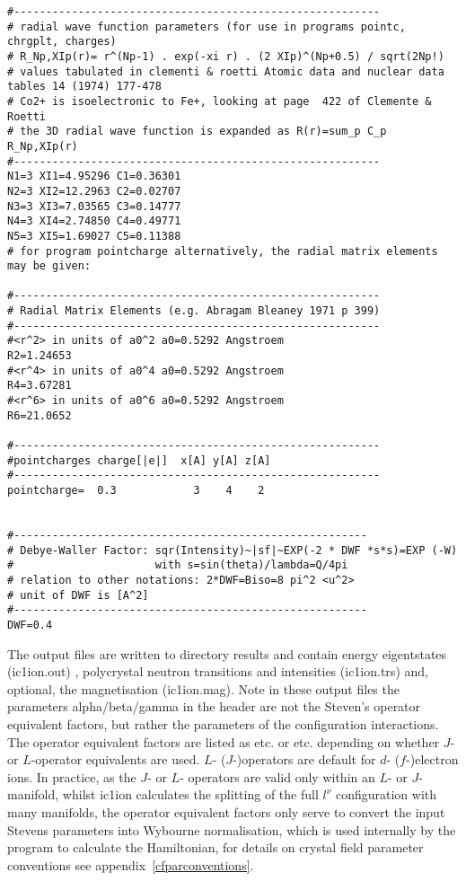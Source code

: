 {\begin{verbatim}
#---------------------------------------------------------
# radial wave function parameters (for use in programs pointc, chrgplt, charges) 
# R_Np,XIp(r)= r^(Np-1) . exp(-xi r) . (2 XIp)^(Np+0.5) / sqrt(2Np!)  
# values tabulated in clementi & roetti Atomic data and nuclear data tables 14 (1974) 177-478
# Co2+ is isoelectronic to Fe+, looking at page  422 of Clemente & Roetti 
# the 3D radial wave function is expanded as R(r)=sum_p C_p R_Np,XIp(r)
#---------------------------------------------------------
N1=3 XI1=4.95296 C1=0.36301 
N2=3 XI2=12.2963 C2=0.02707 
N3=3 XI3=7.03565 C3=0.14777
N4=3 XI4=2.74850 C4=0.49771 
N5=3 XI5=1.69027 C5=0.11388 
# for program pointcharge alternatively, the radial matrix elements may be given:

#---------------------------------------------------------
# Radial Matrix Elements (e.g. Abragam Bleaney 1971 p 399)
#---------------------------------------------------------
#<r^2> in units of a0^2 a0=0.5292 Angstroem
R2=1.24653
#<r^4> in units of a0^4 a0=0.5292 Angstroem
R4=3.67281
#<r^6> in units of a0^6 a0=0.5292 Angstroem
R6=21.0652

#---------------------------------------------------------
#pointcharges charge[|e|]  x[A] y[A] z[A]
#---------------------------------------------------------
pointcharge=  0.3            3    4    2


#-------------------------------------------------------
# Debye-Waller Factor: sqr(Intensity)~|sf|~EXP(-2 * DWF *s*s)=EXP (-W)
#                      with s=sin(theta)/lambda=Q/4pi
# relation to other notations: 2*DWF=Biso=8 pi^2 <u^2>
# unit of DWF is [A^2]
#-------------------------------------------------------
DWF=0.4
\end{verbatim}
}
The output files are written to directory {\prg results} and contain energy eigentstates ({\prg ic1ion.out}) ,
polycrystal neutron transitions and intensities ({\prg ic1ion.trs}) and, optional, %
the magnetisation ({\prg ic1ion.mag}). Note in these
output files the parameters alpha/beta/gamma
in the header are not the Steven's operator equivalent factors, but
rather the parameters of the configuration interactions. The operator equivalent factors are listed as 
{\tt <L||alpha||L>} etc. or {\tt <J||alpha||J>} etc. depending on whether $J$- or $L$-operator equivalents
are used. $L$- ($J$-)operators are default for $d$- ($f$-)electron ions. In practice, as the $J$- or $L$- 
operators are valid only within an $L$- or $J$-manifold, whilst {\prg ic1ion} calculates the splitting of the
full $l^\nu$ configuration with many manifolds, the operator equivalent factors only serve to convert the input
Stevens parameters into Wybourne normalisation, which is used internally by the program to calculate the
Hamiltonian, for details on crystal field parameter conventions see appendix~\ref{cfparconventions}.


